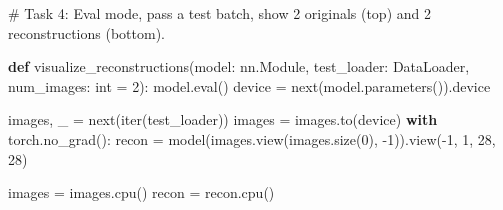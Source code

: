 \documentclass[
  letterpaper,
  DIV=11,
  numbers=noendperiod]{scrartcl}
\newenvironment{Shaded}{\begin{snugshade}}{\end{snugshade}}
\newcommand{\BuiltInTok}[1]{\textcolor[rgb]{0.00,0.23,0.31}{#1}}
\newcommand{\CommentTok}[1]{\textcolor[rgb]{0.37,0.37,0.37}{#1}}
\newcommand{\ControlFlowTok}[1]{\textcolor[rgb]{0.00,0.23,0.31}{\textbf{#1}}}
\newcommand{\DecValTok}[1]{\textcolor[rgb]{0.68,0.00,0.00}{#1}}
\newcommand{\KeywordTok}[1]{\textcolor[rgb]{0.00,0.23,0.31}{\textbf{#1}}}
\newcommand{\NormalTok}[1]{\textcolor[rgb]{0.00,0.23,0.31}{#1}}
\newcommand{\OperatorTok}[1]{\textcolor[rgb]{0.37,0.37,0.37}{#1}}
\begin{document}
\begin{Shaded}
\begin{Highlighting}[]
\CommentTok{\# Task 4: Eval mode, pass a test batch, show 2 originals (top) and 2 reconstructions (bottom).}

\KeywordTok{def}\NormalTok{ visualize\_reconstructions(model: nn.Module, test\_loader: DataLoader, num\_images: }\BuiltInTok{int} \OperatorTok{=} \DecValTok{2}\NormalTok{):}
\NormalTok{    model.}\BuiltInTok{eval}\NormalTok{()}
\NormalTok{    device }\OperatorTok{=} \BuiltInTok{next}\NormalTok{(model.parameters()).device}

\NormalTok{    images, \_ }\OperatorTok{=} \BuiltInTok{next}\NormalTok{(}\BuiltInTok{iter}\NormalTok{(test\_loader))}
\NormalTok{    images }\OperatorTok{=}\NormalTok{ images.to(device)}
    \ControlFlowTok{with}\NormalTok{ torch.no\_grad():}
\NormalTok{        recon }\OperatorTok{=}\NormalTok{ model(images.view(images.size(}\DecValTok{0}\NormalTok{), }\OperatorTok{{-}}\DecValTok{1}\NormalTok{)).view(}\OperatorTok{{-}}\DecValTok{1}\NormalTok{, }\DecValTok{1}\NormalTok{, }\DecValTok{28}\NormalTok{, }\DecValTok{28}\NormalTok{)}

\NormalTok{    images }\OperatorTok{=}\NormalTok{ images.cpu()}
\NormalTok{    recon }\OperatorTok{=}\NormalTok{ recon.cpu()}


\end{Highlighting}
\end{Shaded}
\end{document}
